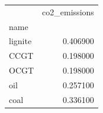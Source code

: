 \begin{tabular}{lr}
\toprule
 & co2_emissions \\
name &  \\
\midrule
lignite & 0.406900 \\
CCGT & 0.198000 \\
OCGT & 0.198000 \\
oil & 0.257100 \\
coal & 0.336100 \\
\bottomrule
\end{tabular}
